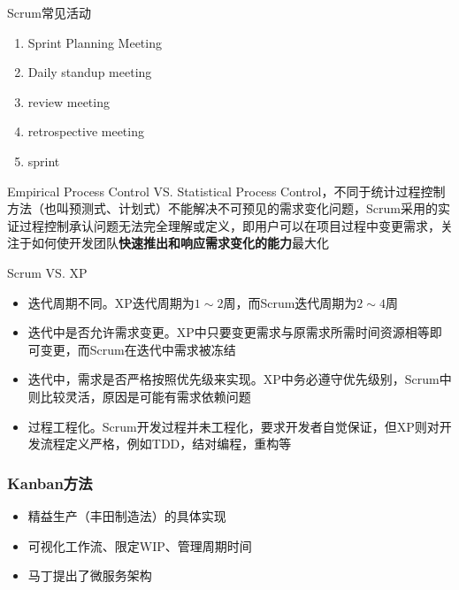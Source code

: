 Scrum常见活动
\vspace{-0.8em}
\begin{multicols}{3}
    \begin{enumerate}[label=\arabic*.]
        \item Sprint Planning Meeting
        \item Daily standup meeting
        \item review meeting
        \item retrospective meeting
        \item sprint
    \end{enumerate}
\end{multicols}
\vspace{-1em}

Empirical Process Control VS. Statistical Process Control，不同于统计过程控制方法（也叫预测式、计划式）不能解决不可预见的需求变化问题，Scrum采用的实证过程控制承认问题无法完全理解或定义，即用户可以在项目过程中变更需求，关注于如何使开发团队\textbf{快速推出和响应需求变化的能力}最大化


Scrum VS. XP
\begin{itemize}
    \item 迭代周期不同。XP迭代周期为$1\sim 2$周，而Scrum迭代周期为$2\sim 4$周
    \item 迭代中是否允许需求变更。XP中只要变更需求与原需求所需时间资源相等即可变更，而Scrum在迭代中需求被冻结
    \item 迭代中，需求是否严格按照优先级来实现。XP中务必遵守优先级别，Scrum中则比较灵活，原因是可能有需求依赖问题
    \item 过程工程化。Scrum开发过程并未工程化，要求开发者自觉保证，但XP则对开发流程定义严格，例如TDD，结对编程，重构等
\end{itemize}

\subsubsection{Kanban方法}
\vspace{-0.8em}
\begin{multicols}{2}
    \begin{itemize}
        \item 精益生产（丰田制造法）的具体实现
        \item 可视化工作流、限定WIP、管理周期时间
        \item 马丁提出了微服务架构
    \end{itemize}
\end{multicols}
\vspace{-1em}

